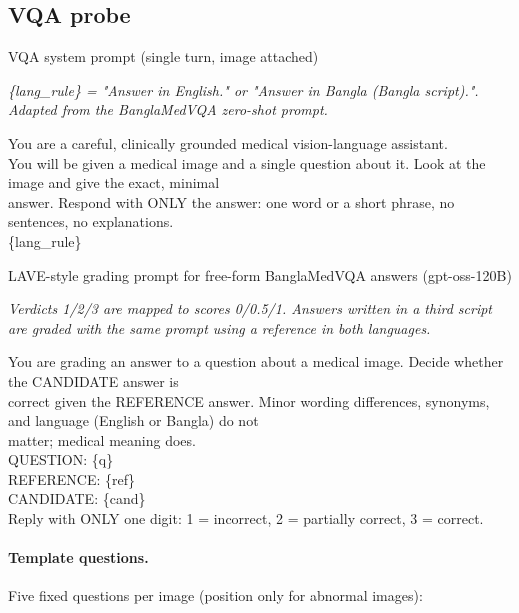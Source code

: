 \subsection{VQA probe}\label{app:p:vqa}

\begin{promptbox}{VQA system prompt (single turn, image attached)}
{\footnotesize\itshape \{lang\_rule\} = "Answer in English." or "Answer in Bangla (Bangla script).". Adapted from the BanglaMedVQA zero-shot prompt.\par}\smallskip
\par{\ttfamily\scriptsize\raggedright You are a careful, clinically grounded medical vision-language assistant. \\\relax
You will be given a medical image and a single question about it. Look at the image and give the exact, minimal \\\relax
answer. Respond with ONLY the answer: one word or a short phrase, no sentences, no explanations. \\\relax
\{lang\_rule\}\par}
\end{promptbox}

\begin{promptbox}{LAVE-style grading prompt for free-form BanglaMedVQA answers (gpt-oss-120B)}
{\footnotesize\itshape Verdicts 1/2/3 are mapped to scores 0/0.5/1. Answers written in a third script are graded with the same prompt using a reference in both languages.\par}\smallskip
\par{\ttfamily\scriptsize\raggedright You are grading an answer to a question about a medical image. Decide whether the CANDIDATE answer is \\\relax
correct given the REFERENCE answer. Minor wording differences, synonyms, and language (English or Bangla) do not \\\relax
matter; medical meaning does. \\\relax
QUESTION: \{q\} \\\relax
REFERENCE: \{ref\} \\\relax
CANDIDATE: \{cand\} \\\relax
Reply with ONLY one digit: 1 = incorrect, 2 = partially correct, 3 = correct.\par}
\end{promptbox}

\paragraph{Template questions.} Five fixed questions per image (position only for abnormal images):

